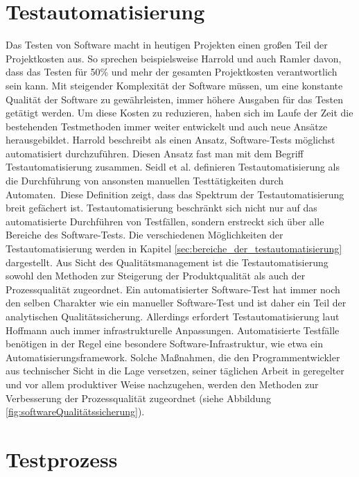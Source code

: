 \section{Testautomatisierung}
\label{sec:testautoGrundlagen}
Das Testen von Software macht in heutigen Projekten einen großen Teil der Projektkosten aus. So sprechen beispielsweise Harrold \cite{harrold_testing:_2000} und auch Ramler \cite{ramler_economic_2006} davon, dass das Testen für 50\% 
und mehr der gesamten Projektkosten verantwortlich sein kann. 
Mit steigender Komplexität der Software müssen, um eine konstante Qualität der Software zu gewährleisten, immer höhere Ausgaben für das Testen getätigt werden.  
Um diese Kosten zu reduzieren, haben sich im Laufe der Zeit die bestehenden Testmethoden immer weiter entwickelt und auch neue Ansätze herausgebildet. Harrold \cite{harrold_testing:_2000} beschreibt als einen Ansatz, Software-Tests möglichst automatisiert durchzuführen. Diesen Ansatz fast man mit dem Begriff Testautomatisierung zusammen.
Seidl et al. \cite[S.7]{seidl_basiswissen_2012} definieren Testautomatisierung als \glqq die Durchführung von ansonsten manuellen Testtätigkeiten durch Automaten.\grqq\
Diese Definition zeigt, dass das Spektrum der Testautomatisierung breit gefächert ist. Testautomatisierung beschränkt sich nicht nur auf das automatisierte Durchführen von Testfällen, sondern erstreckt sich über alle Bereiche des Software-Tests. Die verschiedenen Möglichkeiten der Testautomatisierung werden in Kapitel \ref{sec:bereiche_der_testautomatisierung} dargestellt.
Aus Sicht des Qualitätsmanagement ist die Testautomatisierung sowohl den Methoden zur Steigerung der Produktqualität als auch der Prozessqualität zugeordnet. Ein automatisierter Software-Test hat immer noch den selben Charakter wie ein manueller Software-Test und ist daher ein Teil der analytischen Qualitätssicherung. Allerdings erfordert Testautomatisierung laut Hoffmann \cite[vgl. Seite 25]{hoffmann_software-qualitat_2013} auch immer infrastrukturelle Anpassungen. Automatisierte Testfälle benötigen in der Regel eine besondere Software-Infrastruktur, wie etwa ein Automatisierungsframework. Solche Maßnahmen, die den Programmentwickler aus technischer Sicht in die Lage versetzen, seiner täglichen Arbeit in geregelter und vor allem produktiver Weise nachzugehen, werden den Methoden zur Verbesserung der Prozessqualität zugeordnet (siehe Abbildung \ref{fig:softwareQualitätssicherung}).



\section{Testprozess}
\label{sec:testprozess}

